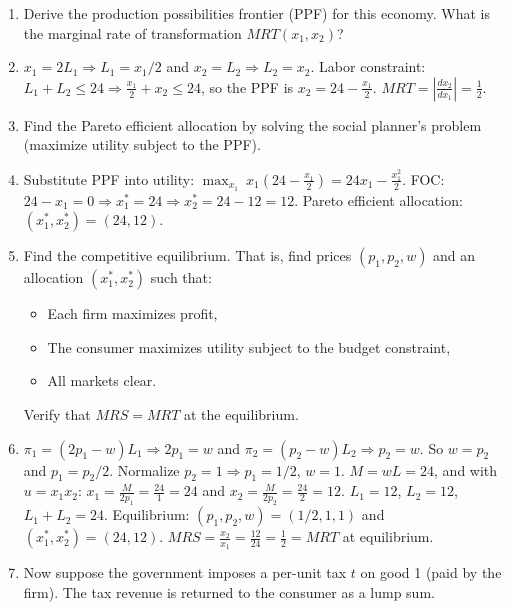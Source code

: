 \documentclass[11pt]{article}
\begin{document}
\begin{enumerate}[label=(\alph*)]

\item[ (a) ] [4 points] Derive the production possibilities frontier (PPF) for this economy. What is the marginal rate of transformation $MRT(x_1, x_2)$?
\item[] $x_1=2L_1\Rightarrow L_1=x_1/2$ and $x_2=L_2\Rightarrow L_2=x_2$. Labor constraint: $L_1+L_2\leq24\Rightarrow\frac{x_1}{2}+x_2\leq24$, so the PPF is $x_2=24-\frac{x_1}{2}$. $MRT=\left|\frac{dx_2}{dx_1}\right|=\frac{1}{2}$.

\item[ (b) ] [5 points] Find the Pareto efficient allocation by solving the social planner's problem (maximize utility subject to the PPF).
\item[] Substitute PPF into utility: $\max_{x_1}\ x_1\!\left(24-\frac{x_1}{2}\right)=24x_1-\frac{x_1^2}{2}$. FOC: $24-x_1=0\Rightarrow x_1^*=24\Rightarrow x_2^*=24-12=12$. Pareto efficient allocation: $(x_1^*,x_2^*)=(24,12)$.

\item[ (c) ] [6 points] Find the competitive equilibrium. That is, find prices $(p_1, p_2, w)$ and an allocation $(x_1^*, x_2^*)$ such that:
\begin{itemize}
\item Each firm maximizes profit,
\item The consumer maximizes utility subject to the budget constraint,
\item All markets clear.
\end{itemize}
Verify that $MRS = MRT$ at the equilibrium.
\item[]  $\pi_1=(2p_1-w)L_1\Rightarrow2p_1=w$ and $\pi_2=(p_2-w)L_2\Rightarrow p_2=w$. So $w=p_2$ and $p_1=p_2/2$. Normalize $p_2=1\Rightarrow p_1=1/2$, $w=1$.  $M=wL=24$, and with $u=x_1x_2$: $x_1=\frac{M}{2p_1}=\frac{24}{1}=24$ and $x_2=\frac{M}{2p_2}=\frac{24}{2}=12$.  $L_1=12$, $L_2=12$, $L_1+L_2=24$. Equilibrium: $(p_1,p_2,w)=(1/2,1,1)$ and $(x_1^*,x_2^*)=(24,12)$. $MRS=\frac{x_2}{x_1}=\frac{12}{24}=\frac{1}{2}=MRT$ at equilibrium.

\item[ (d) ] [10 points] Now suppose the government imposes a per-unit tax $t$ on good 1 (paid by the firm). The tax revenue is returned to the consumer as a lump sum.


\end{enumerate}
\end{document}
